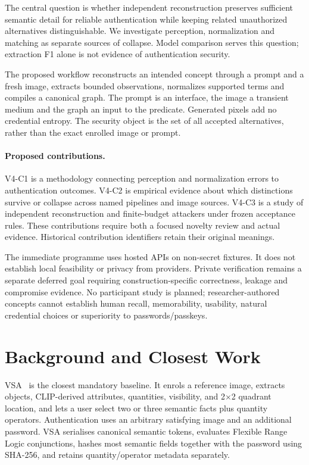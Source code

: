 \documentclass[compsoc,conference,a4paper,10pt,times]{IEEEtran}
\begin{document}
The central question is whether independent reconstruction preserves sufficient semantic detail for reliable authentication while keeping related unauthorized alternatives distinguishable. We investigate perception, normalization and matching as separate sources of collapse. Model comparison serves this question; extraction F1 alone is not evidence of authentication security.

The proposed workflow reconstructs an intended concept through a prompt and a fresh image, extracts bounded observations, normalizes supported terms and compiles a canonical graph. The prompt is an interface, the image a transient medium and the graph an input to the predicate. Generated pixels add no credential entropy. The security object is the set of all accepted alternatives, rather than the exact enrolled image or prompt.

\paragraph{Proposed contributions.}
V4-C1 is a methodology connecting perception and normalization errors to authentication outcomes. V4-C2 is empirical evidence about which distinctions survive or collapse across named pipelines and image sources. V4-C3 is a study of independent reconstruction and finite-budget attackers under frozen acceptance rules. These contributions require both a focused novelty review and actual evidence. Historical contribution identifiers retain their original meanings.

The immediate programme uses hosted APIs on non-secret fixtures. It does not establish local feasibility or privacy from providers. Private verification remains a separate deferred goal requiring construction-specific correctness, leakage and compromise evidence. No participant study is planned; researcher-authored concepts cannot establish human recall, memorability, usability, natural credential choices or superiority to passwords/passkeys.

\section{Background and Closest Work}
\label{sec:related}
VSA~\cite{Jeong2026VSA} is the closest mandatory baseline. It enrols a reference image, extracts objects, CLIP-derived attributes, quantities, visibility, and 2$\times$2 quadrant location, and lets a user select two or three semantic facts plus quantity operators. Authentication uses an arbitrary satisfying image and an additional password. VSA serialises canonical semantic tokens, evaluates Flexible Range Logic conjunctions, hashes most semantic fields together with the password using SHA-256, and retains quantity/operator metadata separately.
\end{document}
